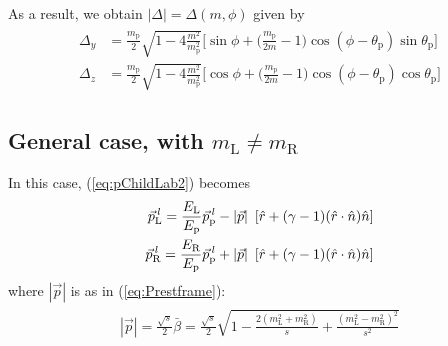\documentclass[12pt]{article}
\newcommand{\bea}{\begin{eqnarray}\begin{aligned}}
\newcommand{\eea}{\end{aligned}\end{eqnarray}}
\begin{document}
As a result, we obtain $|\Delta|=\Delta(m,\phi)$ given by
\bea
 \Delta_y   &= \frac{m_\text{p}}{2} \sqrt{1- 4\frac{m^2}{m_\text{p}^2}}  \bigg[ \sin{\phi} + \bigg(\frac{m_\text{p}}{ 2 m}-1\bigg) \cos{(\phi-\theta_\text{p})} \sin{\theta_\text{p}} \bigg]\\ 
  \Delta_z   &= \frac{m_\text{p}}{2} \sqrt{1- 4\frac{m^2}{m_\text{p}^2}}   \bigg[\cos{\phi} +  \bigg(\frac{m_\text{p}}{2 m}-1\bigg) \cos{(\phi-\theta_\text{p})} \cos{\theta_\text{p}} \bigg]
\eea


\subsection{General case, with  $m_{\text{L}}\neq m_{\text{R}}$}

In this case, (\ref{eq:pChildLab2}) becomes
\bea\label{eq:pChildLab2Gen}
\vec{p}^{\,\it{l}}_{\text{L}}= \frac{E_{\text{L}}}{E_\text{p}} \vec{p}^{\,\it{l}}_\text{p} - |\vec{p}| \,\,\,[ \hat{r} + (\gamma -1) (\hat{r} \cdot \hat{n}) \hat{n} ]  \\
\vec{p}^{\,\it{l}}_{\text{R}}=  \frac{E_{\text{R}}}{E_\text{p}} \vec{p}^{\,\it{l}}_\text{p} +  |\vec{p}| \,\,\,[ \hat{r} + (\gamma -1) (\hat{r} \cdot \hat{n}) \hat{n} ] 
\eea
where $|\vec{p}|$ is as in (\ref{eq:Prestframe}):
\bea
|\vec{p}| =\frac{\sqrt{s}}{2} \bar{\beta}=\frac{\sqrt{s}}{2} \sqrt{1-\frac{2 (m_{\text{L}}^2+m_{\text{R}}^2)}{s}+\frac{(m_{\text{L}}^2-m_{\text{R}}^2)^2}{s^2}}\nonumber
\eea
\end{document}
